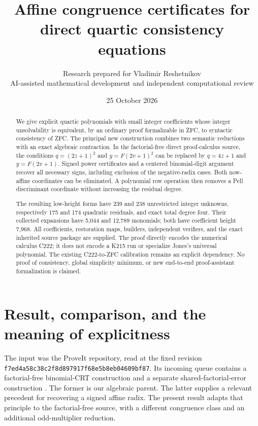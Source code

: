 \documentclass[11pt]{article}
\title{Affine congruence certificates for\\direct quartic consistency equations}
\author{Research prepared for Vladimir Reshetnikov\\\small AI-assisted mathematical development and independent computational review}
\date{25 October 2026}
\newcommand{\file}[1]{\nolinkurl{#1}}
\theoremstyle{remark}\newtheorem{remark}[theorem]{Remark}
\begin{document}
\maketitle
\begin{abstract}
We give explicit quartic polynomials with small integer coefficients whose
integer unsolvability is equivalent, by an ordinary proof formalizable in
ZFC, to syntactic consistency of ZFC. The principal new construction combines
two semantic reductions with an exact algebraic contraction. In the
factorial-free direct proof-calculus source, the conditions
$q=(2z+1)^2$ and $y=F(2v+1)^2$ can be replaced by
$q=4z+1$ and $y=F(2v+1)$. Signed power certificates and a centered
binomial-digit argument recover all necessary signs, including exclusion
of the negative-radix cases. Both now-affine coordinates can be eliminated.
A polynomial row operation then removes a Pell discriminant coordinate
without increasing the residual degree.

The resulting low-height forms have 239 and 238 unrestricted integer
unknowns, respectively 175 and 174 quadratic residuals, and exact total
degree four. Their collected expansions have 5,044 and 12,789 monomials;
both have coefficient height 7,968. All coefficients, restoration maps,
builders, independent verifiers, and the exact inherited source package
are supplied. The proof directly encodes the numerical calculus C222;
it does not encode a K215 run or specialize Jones's universal polynomial.
The existing C222-to-ZFC calibration remains an explicit dependency.
No proof of consistency, global simplicity minimum, or new end-to-end
proof-assistant formalization is claimed.
\end{abstract}
\newpage
\tableofcontents
\newpage

\section{Result, comparison, and the meaning of explicitness}

The input was the ProveIt repository, read at the fixed revision
\file{f7ed4a58c38c2f8d897917f68e5b8eb04609bf87}. Its incoming queue
contains a factorial-free binomial-CRT construction and a separate
shared-factorial-error construction \cite{repo,factorialfree,sharederror}.
The former is our algebraic parent. The latter supplies a relevant
precedent for recovering a signed affine radix. The present result adapts
that principle to the factorial-free source, with a different congruence
class and an additional odd-multiplier reduction.
\end{document}
